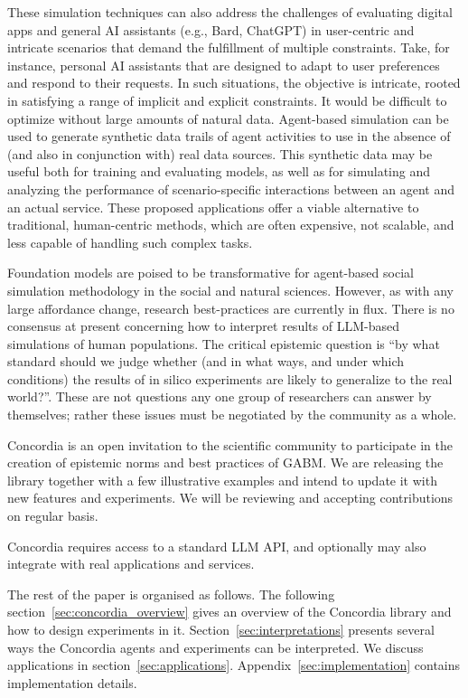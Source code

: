 \documentclass[11pt, a4paper, logo, twocolumn, internal, copyright, numbering]{googledeepmind}
\begin{document}
These simulation techniques can also address the challenges of evaluating digital apps and general AI assistants (e.g., Bard, ChatGPT) in user-centric and intricate scenarios that demand the fulfillment of multiple constraints. Take, for instance, personal AI assistants that are designed to adapt to user preferences and respond to their requests. In such situations, the objective is intricate, rooted in satisfying a range of implicit and explicit constraints. It would be difficult to optimize without large amounts of natural data. Agent-based simulation can be used to generate synthetic data trails of agent activities to use in the absence of (and also in conjunction with) real data sources. This synthetic data may be useful both for training and evaluating models, as well as for simulating and analyzing the performance of scenario-specific interactions between an agent and an actual service. These proposed applications offer a viable alternative to traditional, human-centric methods, which are often expensive, not scalable, and less capable of handling such complex tasks.

Foundation models are poised to be transformative for agent-based social simulation methodology in the social and natural sciences. However, as with any large affordance change, research best-practices are currently in flux. There is no consensus at present concerning how to interpret results of LLM-based simulations of human populations. The critical epistemic question is ``by what standard should we judge whether (and in what ways, and under which conditions) the results of in silico experiments are likely to generalize to the real world?''. These are not questions any one group of researchers can answer by themselves; rather these issues must be negotiated by the community as a whole. 

Concordia is an open invitation to the scientific community to participate in the creation of epistemic norms and best practices of GABM. We are releasing the library together with a few illustrative examples and intend to update it with new features and experiments. We will be reviewing and accepting contributions on regular basis. 

Concordia requires access to a standard LLM API, and optionally may also integrate with real applications and services.

The rest of the paper is organised as follows. The following section~\ref{sec:concordia_overview} gives an overview of the Concordia library and how to design experiments in it. Section~\ref{sec:interpretations} presents several ways the Concordia agents and experiments can be interpreted. We discuss applications in section~\ref{sec:applications}. Appendix~\ref{sec:implementation} contains implementation details.
\end{document}

